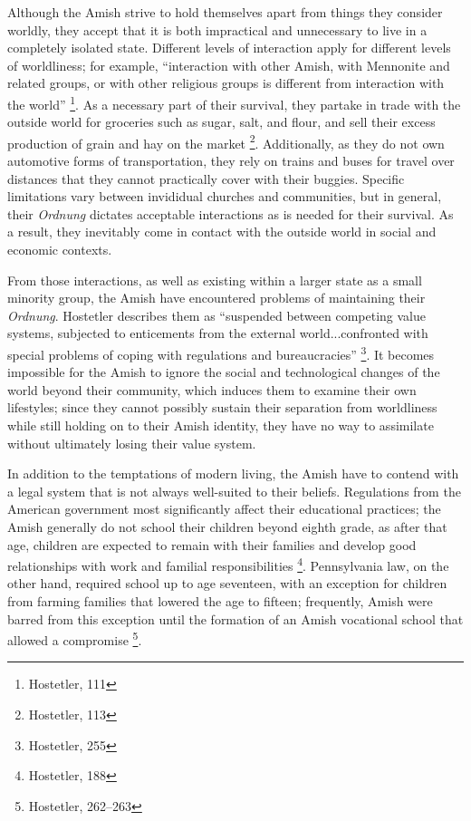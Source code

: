Although the Amish strive to hold themselves apart from things they consider
worldly, they accept that it is both impractical and unnecessary to live in a
completely isolated state. Different levels of interaction apply for different
levels of worldliness; for example, ``interaction with other Amish, with
Mennonite and related groups, or with other religious groups is different from
interaction with the world'' \footnote{Hostetler, 111}. As a necessary part of
their survival, they partake in trade with the outside world for groceries such
as sugar, salt, and flour, and sell their excess production of grain and hay on
the market \footnote{Hostetler, 113}. Additionally, as they do not own
automotive forms of transportation, they rely on trains and buses for travel
over distances that they cannot practically cover with their buggies. Specific
limitations vary between invididual churches and communities, but in general,
their \textit{Ordnung} dictates acceptable interactions as is needed for their
survival. As a result, they inevitably come in contact with the outside world in social and
economic contexts.

From those interactions, as well as existing within a larger state as a small
minority group, the Amish have encountered problems of maintaining their
\textit{Ordnung}. Hostetler describes them as ``suspended between competing
value systems, subjected to enticements from the external world...confronted
with special problems of coping with regulations and bureaucracies''
\footnote{Hostetler, 255}. It becomes impossible for the Amish to ignore the
social and technological changes of the world beyond their community, which
induces them to examine their own lifestyles; since they cannot possibly
sustain their separation from worldliness while still holding on to their Amish
identity, they have no way to assimilate without ultimately losing their value
system.

In addition to the temptations of modern living, the Amish have to contend with
a legal system that is not always well-suited to their beliefs. Regulations
from the American government most significantly affect their educational
practices; the Amish generally do not
school their children beyond eighth grade, as after that age, children are
expected to remain with their families and develop good relationships with work
and familial responsibilities \footnote{Hostetler, 188}. Pennsylvania law, on the other
hand, required school up to age seventeen, with an exception for children from
farming families that lowered the age to fifteen; frequently, Amish were barred
from this exception until the formation of an Amish vocational school that
allowed a compromise \footnote{Hostetler, 262--263}.

